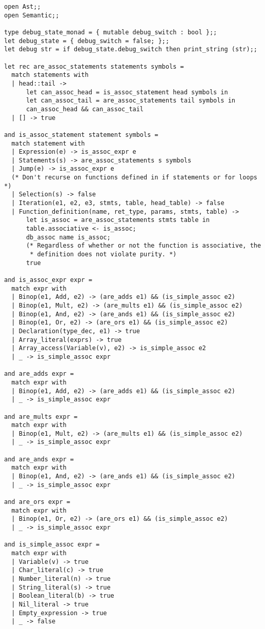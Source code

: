 \begin{verbatim}
open Ast;;
open Semantic;;

type debug_state_monad = { mutable debug_switch : bool };;
let debug_state = { debug_switch = false; };;
let debug str = if debug_state.debug_switch then print_string (str);;

let rec are_assoc_statements statements symbols =
  match statements with
  | head::tail ->
      let can_assoc_head = is_assoc_statement head symbols in
      let can_assoc_tail = are_assoc_statements tail symbols in
      can_assoc_head && can_assoc_tail
  | [] -> true

and is_assoc_statement statement symbols =
  match statement with
  | Expression(e) -> is_assoc_expr e
  | Statements(s) -> are_assoc_statements s symbols
  | Jump(e) -> is_assoc_expr e
  (* Don't recurse on functions defined in if statements or for loops *)
  | Selection(s) -> false
  | Iteration(e1, e2, e3, stmts, table, head_table) -> false
  | Function_definition(name, ret_type, params, stmts, table) ->
      let is_assoc = are_assoc_statements stmts table in
      table.associative <- is_assoc;
      db_assoc name is_assoc;
      (* Regardless of whether or not the function is associative, the
       * definition does not violate purity. *)
      true

and is_assoc_expr expr =
  match expr with
  | Binop(e1, Add, e2) -> (are_adds e1) && (is_simple_assoc e2)
  | Binop(e1, Mult, e2) -> (are_mults e1) && (is_simple_assoc e2)
  | Binop(e1, And, e2) -> (are_ands e1) && (is_simple_assoc e2)
  | Binop(e1, Or, e2) -> (are_ors e1) && (is_simple_assoc e2)
  | Declaration(type_dec, e1) -> true
  | Array_literal(exprs) -> true
  | Array_access(Variable(v), e2) -> is_simple_assoc e2
  | _ -> is_simple_assoc expr

and are_adds expr =
  match expr with
  | Binop(e1, Add, e2) -> (are_adds e1) && (is_simple_assoc e2)
  | _ -> is_simple_assoc expr

and are_mults expr =
  match expr with
  | Binop(e1, Mult, e2) -> (are_mults e1) && (is_simple_assoc e2)
  | _ -> is_simple_assoc expr

and are_ands expr =
  match expr with
  | Binop(e1, And, e2) -> (are_ands e1) && (is_simple_assoc e2)
  | _ -> is_simple_assoc expr

and are_ors expr =
  match expr with
  | Binop(e1, Or, e2) -> (are_ors e1) && (is_simple_assoc e2)
  | _ -> is_simple_assoc expr

and is_simple_assoc expr =
  match expr with
  | Variable(v) -> true
  | Char_literal(c) -> true
  | Number_literal(n) -> true
  | String_literal(s) -> true
  | Boolean_literal(b) -> true
  | Nil_literal -> true
  | Empty_expression -> true
  | _ -> false


\end{verbatim}
